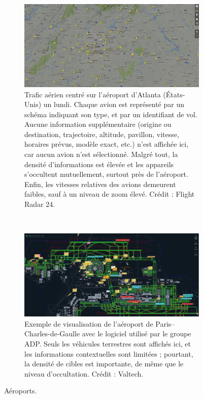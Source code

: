 	\begin{figure}[!htbp]
		\begin{subfigure}{\textwidth}
			\centering
			\includegraphics[width=\textwidth]{figures/ch1/atlanta}
			\caption[Trafic aérien, Atlanta]{Trafic aérien centré sur l'aéroport d'Atlanta (États-Unis) un lundi. Chaque avion est représenté par un schéma indiquant son type, et par un identifiant de vol. Aucune information supplémentaire (origine ou destination, trajectoire, altitude, pavillon, vitesse, horaires prévus, modèle exact, etc.) n'est affichée ici, car aucun avion n'est sélectionné. Malgré tout, la densité d'informations est élevée et les appareils s'occultent mutuellement, surtout près de l'aéroport. Enfin, les vitesses relatives des avions demeurent faibles, sauf à un niveau de zoom élevé. Crédit : Flight Radar 24.}
			\label{fig:atlanta}
		\end{subfigure}
		~
		\begin{subfigure}{\textwidth}
			\centering
			\includegraphics[width=\textwidth]{figures/ch1/adp}
			\caption[ADP -- Roissy]{Exemple de visualisation de l'aéroport de Paris--Charles-de-Gaulle avec le logiciel utilisé par le groupe ADP. Seuls les véhicules terrestres sont affichés ici, et les informations contextuelles sont limitées ; pourtant, la densité de cibles est importante, de même que le niveau d'occultation. Crédit : Valtech.}
			\label{fig:adp}
		\end{subfigure}
		\caption[Aéroports]{Aéroports.}
		\label{fig:airports}
	\end{figure}
	
